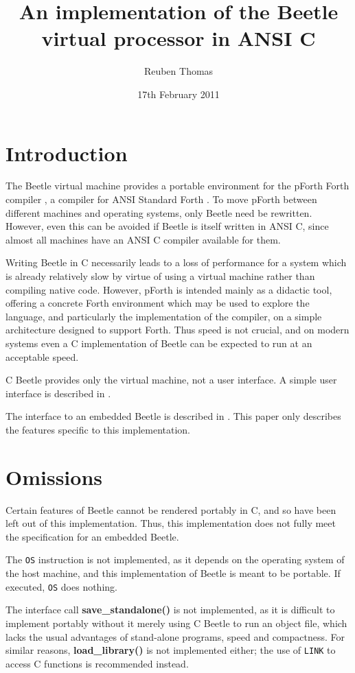 \documentclass{article}
\title{An implementation of the Beetle virtual processor in ANSI C}
\author{Reuben Thomas}
\date{17th February 2011}
\begin{document}
\maketitle


\section{Introduction}

The Beetle virtual machine \cite{beetledis} provides a portable environment
for the pForth Forth compiler \cite{beetledis}, a compiler for ANSI Standard
Forth \cite{ANSIforth}. To move pForth between different machines and
operating systems, only Beetle need be rewritten. However, even this can be
avoided if Beetle is itself written in ANSI C, since almost all machines have
an ANSI C compiler available for them.

Writing Beetle in C necessarily leads to a loss of performance for a system
which is already relatively slow by virtue of using a virtual machine
rather than compiling native code. However, pForth is intended mainly as a
didactic tool, offering a concrete Forth environment which may be used to
explore the language, and particularly the implementation of the compiler, on
a simple architecture designed to support Forth. Thus speed is not crucial,
and on modern systems even a C implementation of Beetle can be expected to
run at an acceptable speed.

C Beetle provides only the virtual machine, not a user interface. A simple
user interface is described in \cite{beetledis}.

The interface to an embedded Beetle is described in \cite{beetledis}. This paper
only describes the features specific to this implementation.


\section{Omissions}
\label{omissions}

Certain features of Beetle cannot be rendered portably in C, and so have been
left out of this implementation. Thus, this implementation does not fully
meet the specification for an embedded Beetle.

The {\tt OS} instruction is not implemented, as it depends on the operating
system of the host machine, and this implementation of Beetle is meant to be
portable. If executed, {\tt OS} does nothing.

The interface call {\bf save\_standalone()} is not implemented, as it is
difficult to implement portably without it merely using C Beetle to run an
object file, which lacks the usual advantages of stand-alone programs, speed
and compactness. For similar reasons, {\bf load\_library()} is not
implemented either; the use of {\tt LINK} to access C functions is
recommended instead.
\end{document}

